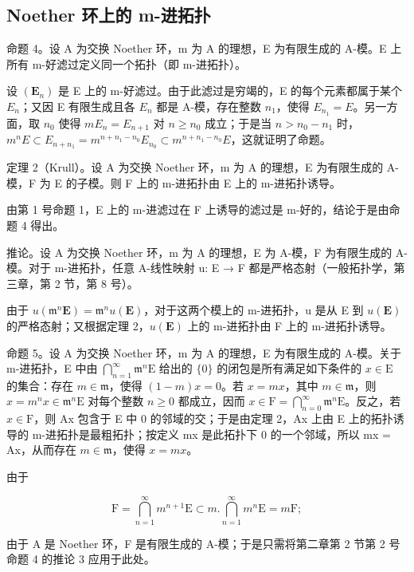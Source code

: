 \subsection{Noether 环上的 m-进拓扑}

命题 4。设 A 为交换 Noether 环，m 为 A 的理想，E 为有限生成的 A-模。E 上所有 m-好滤过定义同一个拓扑（即 m-进拓扑）。

设 \((\mathbf{E}_{n})\) 是 E 上的 m-好滤过。由于此滤过是穷竭的，E 的每个元素都属于某个 \(E_{n}\)；又因 E 有限生成且各 \(E_{n}\) 都是 A-模，存在整数 \(n_{1}\)，使得 \(E_{n_{1}} = E\)。另一方面，取 \(n_{0}\) 使得 \(mE_{n} = E_{n+1}\) 对 \(n \geqslant n_{0}\) 成立；于是当 \(n > n_{0} - n_{1}\) 时，\(m^{n}E \subset E_{n+n_{1}} = m^{n+n_{1}-n_{0}}E_{n_{0}} \subset m^{n+n_{1}-n_{0}}E\)，这就证明了命题。

定理 2（Krull）。设 A 为交换 Noether 环，m 为 A 的理想，E 为有限生成的 A-模，F 为 E 的子模。则 F 上的 m-进拓扑由 E 上的 m-进拓扑诱导。

由第 1 号命题 1，E 上的 m-进滤过在 F 上诱导的滤过是 m-好的，结论于是由命题 4 得出。

推论。设 A 为交换 Noether 环，m 为 A 的理想，E 为 A-模，F 为有限生成的 A-模。对于 m-进拓扑，任意 A-线性映射 u: E → F 都是严格态射（一般拓扑学，第三章，第 2 节，第 8 号）。

由于 \(u(\mathfrak{m}^{n}\mathbf{E}) = \mathfrak{m}^{n}u(\mathbf{E})\)，对于这两个模上的 m-进拓扑，u 是从 E 到 \(u(\mathbf{E})\) 的严格态射；又根据定理 2，\(u(\mathbf{E})\) 上的 m-进拓扑由 F 上的 m-进拓扑诱导。

命题 5。设 A 为交换 Noether 环，m 为 A 的理想，E 为有限生成的 A-模。关于 m-进拓扑，E 中由 \(\bigcap_{n=1}^{\infty} \mathfrak{m}^{n}\mathrm{E}\) 给出的 \(\{0\}\) 的闭包是所有满足如下条件的 \(x \in \mathrm{E}\) 的集合：存在 \(m \in \mathfrak{m}\)，使得 \((1 - m)x = 0\)。若 \(x = mx\)，其中 \(m \in \mathfrak{m}\)，则 \(x = m^{n}x \in \mathfrak{m}^{n}\mathrm{E}\) 对每个整数 \(n \geqslant 0\) 都成立，因而 \(x \in \mathrm{F} = \bigcap_{n=0}^{\infty} \mathfrak{m}^{n}\mathrm{E}\)。反之，若 \(x \in \mathrm{F}\)，则 Ax 包含于 E 中 0 的邻域的交；于是由定理 2，Ax 上由 E 上的拓扑诱导的 m-进拓扑是最粗拓扑；按定义 mx 是此拓扑下 0 的一个邻域，所以 mx = Ax，从而存在 \(m \in \mathfrak{m}\)，使得 \(x = mx\)。

由于

\[
\mathrm{F} = \bigcap_ {n = 1} ^ {\infty} m ^ {n + 1} \mathrm{E} \subset m. \bigcap_ {n = 1} ^ {\infty} m ^ {n} \mathrm{E} = m \mathrm{F};
\]

由于 A 是 Noether 环，F 是有限生成的 A-模；于是只需将第二章第 2 节第 2 号命题 4 的推论 3 应用于此处。

